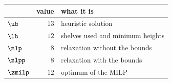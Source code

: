 \begin{center}\small
\begin{tabular}{lrl}
\toprule
 & value & what it is \\
\midrule
$\ub$ & $13$ & heuristic solution \\
$\lb$ & $12$ & shelves used and minimum heights \\
$\zlp$ & $8$ & relaxation without the bounds \\
$\zlpp$ & $8$ & relaxation with the bounds \\
$\zmilp$ & $12$ & optimum of the MILP \\
\bottomrule
\end{tabular}
\end{center}
